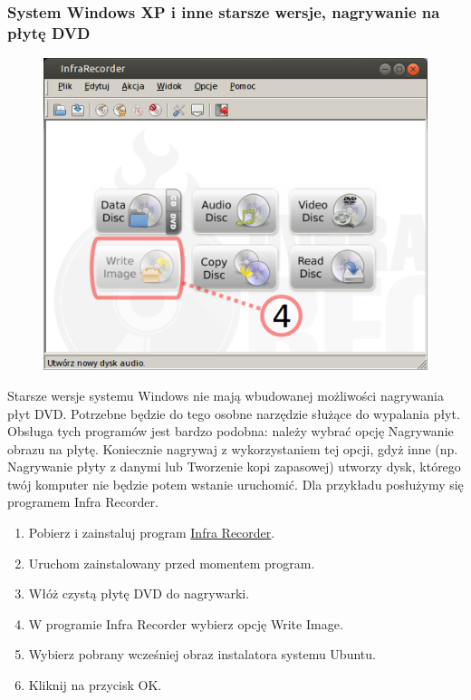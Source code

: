 \vspace{1cm}

\subsubsection{System Windows XP i inne starsze wersje, nagrywanie na płytę DVD}
\begin{figure}
	\vspace{-10pt}
	\includegraphics[width=\linewidth]{images/instalacja_nagrywanie_obrazu_DVD_winXP.png}
\end{figure}

Starsze wersje systemu Windows nie mają wbudowanej możliwości nagrywania płyt DVD. Potrzebne będzie do tego osobne narzędzie służące do wypalania płyt. Obsługa tych programów jest bardzo podobna: należy wybrać opcję Nagrywanie obrazu na płytę. Koniecznie nagrywaj z wykorzystaniem tej opcji, gdyż inne (np. Nagrywanie płyty z danymi lub Tworzenie kopi zapasowej) utworzy dysk, którego twój komputer nie będzie potem wstanie uruchomić. Dla przykładu posłużymy się programem Infra Recorder.

\begin{enumerate}[label=\protect\circled{\arabic*}]
\item Pobierz i zainstaluj program \href{http://infrarecorder.org/?page_id=5}{Infra Recorder}.
\item Uruchom zainstalowany przed momentem program.
\item Włóż czystą płytę DVD do nagrywarki.
\item W programie Infra Recorder wybierz opcję \textcolor{ubuntu_orange}{Write Image}.
\item Wybierz pobrany wcześniej obraz instalatora systemu Ubuntu.
\item Kliknij na przycisk \textcolor{ubuntu_orange}{OK}.
\end{enumerate}
